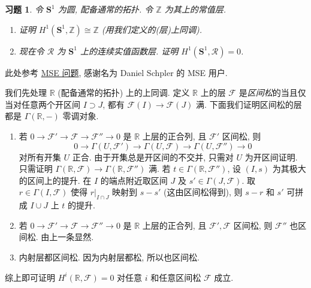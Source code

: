 \documentclass{article}
\theoremstyle{exercise}
\newtheorem{exercise}{习题}[section]
\theoremstyle{plain}
\theoremstyle{remark}
\newenvironment{proofc}{\proof}{\endproof}
\def\Z{\mathbb{Z}}
\def\R{\mathbb{R}}
\def\bS{\mathbf{S}}
\def\sF{\mathscr{F}}
\def\sR{\mathscr{R}}
\begin{document}
\begin{exercise}
  令 $\bS^1$ 为圆, 配备通常的拓扑. 令 $\Z$ 为其上的常值层.
  \begin{enumerate}[label=(\arabic*)]
    \item 证明 $H^1(\bS^1, \Z) \cong \Z$ (用我们定义的(层)上同调).
    \item 现在令 $\sR$ 为 $\bS^1$ 上的连续实值函数层. 证明 $H^1(\bS^1, \sR) = 0$.
  \end{enumerate}
\end{exercise}

\begin{proofc}
  此处参考 \href{https://math.stackexchange.com/questions/2801221/why-does-the-sheaf-cohomology-of-the-constant-sheaf-on-mathbbr-vanish}{MSE 问题},
  感谢名为 Daniel Schpler 的 MSE 用户.

  我们先处理 $\R$ (配备通常的拓扑) 上的上同调.
  定义 $\R$ 上的层 $\sF$ 是\emph{区间松}的当且仅当对任意两个开区间 $I \supset J$, 都有 $\sF(I) \to \sF(J)$ 满.
  下面我们证明区间松的层都是 $\Gamma(\R, -)$ 零调对象.
  \begin{enumerate}
    \item 若 $0 \to \sF' \to \sF \to \sF'' \to 0$ 是 $\R$ 上层的正合列, 且 $\sF'$ 区间松, 则
          \[
          0 \to \Gamma(U, \sF') \to \Gamma(U, \sF) \to \Gamma(U, \sF'') \to 0
          \]
          对所有开集 $U$ 正合. 由于开集总是开区间的不交并, 只需对 $U$ 为开区间证明.
          只需证明 $\Gamma(\R, \sF) \to \Gamma(\R, \sF'')$ 满.
          若 $t \in \Gamma(\R, \sF'')$, 设 $(I, s)$ 为其极大的区间上的提升.
          在 $I$ 的端点附近取区间 $J$ 及 $s' \in \Gamma(J, \sF)$.
          取 $r \in \Gamma(I, \sF)$ 使得 $r|_{I \cap J}$ 映射到 $s - s'$ (这由区间松得到),
          则 $s - r$ 和 $s'$ 可拼成 $I \cup J$ 上 $t$ 的提升.
    \item 若 $0 \to \sF' \to \sF \to \sF'' \to 0$ 是 $\R$ 上层的正合列, 且 $\sF', \sF$ 区间松,
          则 $\sF''$ 也区间松. 由上一条显然.
    \item 内射层都区间松. 因为内射层都松, 所以也区间松.
  \end{enumerate}
  综上即可证明 $H^i(\R, \sF) = 0$ 对任意 $i$ 和任意区间松 $\sF$ 成立.


\end{proofc}
\end{document}
